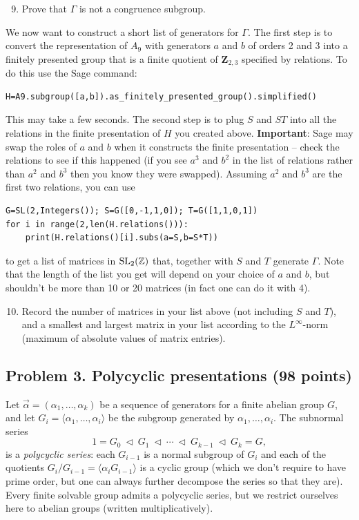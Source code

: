 \documentclass[11pt]{article}
\newcommand{\Z}{\mathbb{Z}}
\newcommand{\SL}{{\rm SL}}
\theoremstyle{definition}
\begin{document}
\begin{enumerate}[{\bf(a)}]
\setcounter{enumi}{8}
\item Prove that $\Gamma$ is not a congruence subgroup.
\end{enumerate}
We now want to construct a short list of generators for $\Gamma$.
The first step is to convert the representation of $A_9$ with generators $a$ and $b$ of orders 2 and 3 into a finitely presented group that is a finite quotient of $\mathbf{Z}_{2,3}$ specified by relations.  To do this use the Sage command:
\begin{lstlisting}
H=A9.subgroup([a,b]).as_finitely_presented_group().simplified()
\end{lstlisting}
This may take a few seconds.  The second step is to plug $S$ and $ST$ into all the relations in the finite presentation of $H$ you created above.
\textbf{Important}: Sage may swap the roles of $a$ and $b$ when it constructs the finite presentation -- check the relations to see if this happened (if you see $a^3$ and $b^2$ in the list of relations rather than $a^2$ and $b^3$ then you know they were swapped).
Assuming $a^2$ and $b^3$ are the first two relations, you can use
\begin{lstlisting}
G=SL(2,Integers()); S=G([0,-1,1,0]); T=G([1,1,0,1])
for i in range(2,len(H.relations())):
	print(H.relations()[i].subs(a=S,b=S*T))
\end{lstlisting}
to get a list of matrices in $\SL_2(\Z)$ that, together with $S$ and $T$ generate $\Gamma$.
Note that the length of the list you get will depend on your choice of $a$ and $b$, but shouldn't be more than 10 or 20 matrices (in fact one can do it with 4).

\begin{enumerate}[{\bf(a)}]
\setcounter{enumi}{9}
\item Record the number of matrices in your list above (not including $S$ and $T$), and a smallest and largest matrix in your list according to the $L^\infty$-norm (maximum of absolute values of matrix entries).
\end{enumerate}

\subsection*{Problem 3. Polycyclic presentations (98 points)}

Let $\vec{\alpha}=(\alpha_1,\ldots,\alpha_k)$ be a sequence of generators for a finite abelian group $G$, and let
$G_i=\langle\alpha_1,\ldots,\alpha_i\rangle$ be the subgroup generated by $\alpha_1,\ldots,\alpha_i$.
The subnormal series
\begin{equation*}
1=G_0\ \triangleleft\  G_1\ \triangleleft\ \cdots\ \triangleleft\ G_{k-1}\ \triangleleft\ G_{k} = G,
\end{equation*}
is a \emph{polycyclic series}: each $G_{i-1}$ is a normal subgroup of $G_i$ and each of the quotients $G_i/G_{i-1}=\langle\alpha_iG_{i-1}\rangle$ is a cyclic group (which we don't require to have prime order, but one can always further decompose the series so that they are).
Every finite solvable group admits a polycyclic series, but we restrict ourselves here to abelian groups (written multiplicatively).
\end{document}
